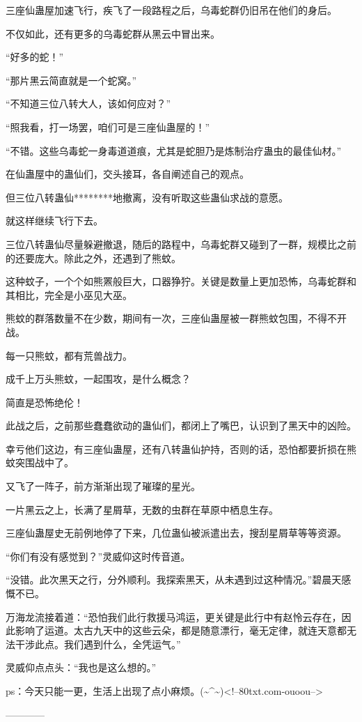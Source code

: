 \begin{this_body}
三座仙蛊屋加速飞行，疾飞了一段路程之后，乌毒蛇群仍旧吊在他们的身后。

不仅如此，还有更多的乌毒蛇群从黑云中冒出来。

“好多的蛇！”

“那片黑云简直就是一个蛇窝。”

“不知道三位八转大人，该如何应对？”

“照我看，打一场罢，咱们可是三座仙蛊屋的！”

“不错。这些乌毒蛇一身毒道道痕，尤其是蛇胆乃是炼制治疗蛊虫的最佳仙材。”

在仙蛊屋中的蛊仙们，交头接耳，各自阐述自己的观点。

但三位八转蛊仙********地撤离，没有听取这些蛊仙求战的意愿。

就这样继续飞行下去。

三位八转蛊仙尽量躲避撤退，随后的路程中，乌毒蛇群又碰到了一群，规模比之前的还要庞大。除此之外，还遇到了熊蚊。

这种蚊子，一个个如熊罴般巨大，口器狰狞。关键是数量上更加恐怖，乌毒蛇群和其相比，完全是小巫见大巫。

熊蚊的群落数量不在少数，期间有一次，三座仙蛊屋被一群熊蚊包围，不得不开战。

每一只熊蚊，都有荒兽战力。

成千上万头熊蚊，一起围攻，是什么概念？

简直是恐怖绝伦！

此战之后，之前那些蠢蠢欲动的蛊仙们，都闭上了嘴巴，认识到了黑天中的凶险。

幸亏他们这边，有三座仙蛊屋，还有八转蛊仙护持，否则的话，恐怕都要折损在熊蚊突围战中了。

又飞了一阵子，前方渐渐出现了璀璨的星光。

一片黑云之上，长满了星屑草，无数的虫群在草原中栖息生存。

三座仙蛊屋史无前例地停了下来，几位蛊仙被派遣出去，搜刮星屑草等等资源。

“你们有没有感觉到？”灵威仰这时传音道。

“没错。此次黑天之行，分外顺利。我探索黑天，从未遇到过这种情况。”碧晨天感慨不已。

万海龙流接着道：“恐怕我们此行救援马鸿运，更关键是此行中有赵怜云存在，因此影响了运道。太古九天中的这些云朵，都是随意漂行，毫无定律，就连天意都无法干涉此点。我们遇到什么，全凭运气。”

灵威仰点点头：“我也是这么想的。”

ps：今天只能一更，生活上出现了点小麻烦。(\~{}\^{}\~{})<!--80txt.com-ouoou-->

------------

\end{this_body}

